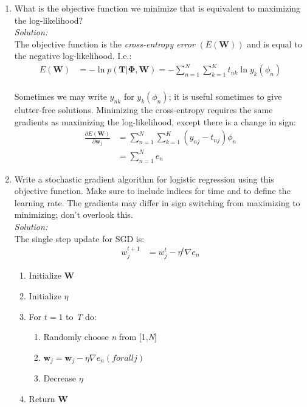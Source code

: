 \documentclass[12pt,a4paper]{article}
\begin{document}
\begin{enumerate}
		\item What is the objective function we minimize that is equivalent to maximizing the log-likelihood? \\
		\emph{Solution:} \\
		The objective function is the \textit{cross-entropy error} $(E(\textbf{W}))$ and is equal to the negative log-likelihood. I.e.: 
		\begin{align*}
			E(\textbf{W}) &= -\ln p(\textbf{T}|\boldsymbol{\Phi},\textbf{W}) = - \sum_{n=1}^{N}\sum_{k=1}^{K} t_{nk} \ln y_k(\phi_n)
		\end{align*}
		\\
		Sometimes we may write $y_{nk}$ for $y_k(\phi_n)$; it is useful sometimes to give clutter-free solutions. Minimizing the cross-entropy requires the same gradients as maximizing the log-likelihood, except there is a change in sign:
		\begin{align*}
			\frac{\partial E(\textbf{W})}{\partial \textbf{w}_j} &= \sum_{n=1}^{N}\sum_{k=1}^{K} (y_{nj} - t_{nj})\phi_n \\
			&= \sum_{n=1}^{N} e_n
		\end{align*}
		
		\item Write a stochastic gradient algorithm for logistic regression using this objective function. Make sure to include indices for time and to define the learning rate. The gradients may differ in sign switching from maximizing to minimizing; don't overlook this.\\
		\emph{Solution:} \\
		The single step update for SGD is:		    
		\begin{align*}
			w_j^{t+1} &= w_j^{t} - \eta^{t} \nabla e_n
		\end{align*}
		
		\begin{enumerate}[label=(\alph*)]
			\item Initialize \textbf{W}
			\item Initialize $\eta$
			\item For $\textit{t} = 1$ to \textit{T} do:
			\begin{enumerate}[label = (\roman*)]
				\item Randomly choose \textit{n} from 			 				[1,\textit{N}]
				\item $\textbf{w}_j = \textbf{w}_j - \eta\nabla 						e_n(for all \textit{j})$
				\item Decrease $\eta$
			\end{enumerate}
			\item Return \textbf{W}
		\end{enumerate}
		

\end{enumerate}
\end{document}
